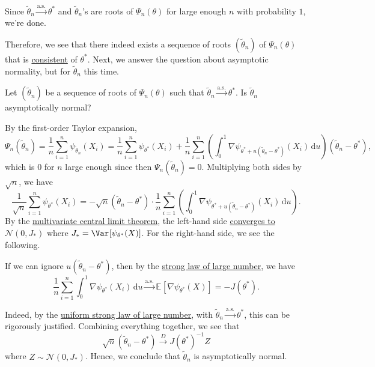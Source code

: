 \begin{answer}
	Since \(\widetilde{\theta} _n \overset{\text{a.s.} }{\to} \theta ^{\ast} \) and \(\widetilde{\theta} _n\)'s are roots of \(\Psi _n(\theta )\) for large enough \(n\) with probability \(1\), we're done.
\end{answer}

Therefore, we see that there indeed exists a sequence of roots \((\widetilde{\theta} _n)\) of \(\Psi _n(\theta )\) that is \hyperref[def:consistent]{consistent} of \(\theta ^{\ast} \). Next, we answer the question about asymptotic normality, but for \(\widetilde{\theta} _n\) this time.

\begin{problem*}
	Let \((\widetilde{\theta} _n)\) be a sequence of roots of \(\Psi _n(\theta )\) such that \(\widetilde{\theta} _n \overset{\text{a.s.} }{\to} \theta ^{\ast} \). Is \(\widetilde{\theta} _n\) asymptotically normal?
\end{problem*}
\begin{answer}
	By the first-order Taylor expansion,
	\[
		\Psi _n(\widetilde{\theta} _n)
		= \frac{1}{n}\sum_{i=1}^{n} \psi _{\widetilde{\theta} _n}(X_i)
		= \frac{1}{n}\sum_{i=1}^{n} \psi _{\theta ^{\ast} }(X_i) + \frac{1}{n}\sum_{i=1}^{n} \left( \int_{0}^{1} \nabla \psi _{\theta ^{\ast} + u (\widetilde{\theta} _n - \theta ^{\ast} )} (X_i) \,\mathrm{d}u \right) (\widetilde{\theta} _n - \theta ^{\ast} ),
	\]
	which is \(0\) for \(n\) large enough since then \(\Psi _n(\widetilde{\theta} _n) = 0\). Multiplying both sides by \(\sqrt{n} \), we have
	\[
		\frac{1}{\sqrt{n} }\sum_{i=1}^{n} \psi _{\theta ^{\ast} }(X_i)
		= -\sqrt{n} (\widetilde{\theta} _n - \theta ^{\ast} ) \cdot \frac{1}{n}\sum_{i=1}^{n} \left( \int_{0}^{1} \nabla \psi _{\theta ^{\ast} + u (\widetilde{\theta} _n - \theta ^{\ast} )} (X_i) \,\mathrm{d}u \right) .
	\]
	By the \hyperref[thm:multivariate-CLT]{multivariate central limit theorem}, the left-hand side \hyperref[def:converge-in-distribution]{converges to} \(\mathcal{N} (0, J_{\ast})\) where \(J_\ast = \Var_{}[\psi _{\theta ^{\ast} }(X)] \). For the right-hand side, we see the following.

	\begin{intuition}
		If we can ignore \(u(\widetilde{\theta} _n - \theta ^{\ast} )\), then by the \hyperref[thm:SLLN]{strong law of large number}, we have
		\[
			\frac{1}{n}\sum_{i=1}^{n} \int_{0}^{1} \nabla \psi _{\theta ^{\ast} }(X_i) \,\mathrm{d}u
			\overset{\text{a.s.} }{\to} \mathbb{E}_{}[\nabla \psi _{\theta ^{\ast} }(X)]
			= - J(\theta ^{\ast} ).
		\]
	\end{intuition}

	Indeed, by the \hyperref[thm:uniform-SLLN]{uniform strong law of large number}, with \(\widetilde{\theta} _n \overset{\text{a.s.} }{\to} \theta ^{\ast} \), this can be rigorously justified. Combining everything together, we see that
	\[
		\sqrt{n} (\widetilde{\theta} _n - \theta ^{\ast} )
		\overset{D}{\to} J(\theta ^{\ast} )^{-1} Z
	\]
	where \(Z \sim \mathcal{N} (0, J_{\ast})\). Hence, we conclude that \(\widetilde{\theta} _n\) is asymptotically normal.
\end{answer}

